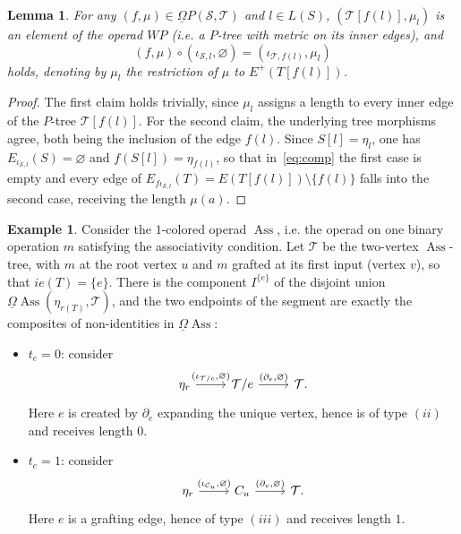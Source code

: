 \documentclass{amsart}
\newtheorem{lemma}[formula]{Lemma}
\theoremstyle{definition}
\newtheorem{example}[formula]{Example}
\theoremstyle{remark}
\newcommand{\lb}{\lbrace}
\newcommand{\rb}{\rbrace}
\DeclareMathOperator{\Ass}{Ass}
\begin{document}
	\begin{lemma}\label{lm:leafcomp}
		For any $(f,\mu)\in\underline{\Omega} P(\mathcal{S},\mathcal{T})$ and $l\in L(S)$, $(\mathcal{T}[f(l)],\mu_{l})$ is an element of the operad $WP$ (i.e. a  $P$-tree with metric on its inner edges), and
		\[
			(f,\mu)\circ(\iota_{\mathcal{S},l},\varnothing)=(\iota_{\mathcal{T},f(l)},\mu_{l})
		\]
		holds, denoting by
		$\mu_{l}$ the restriction of $\mu$ to $E^{+}(T[f(l)])$. 
	\end{lemma}
	\begin{proof}
		The first claim holds trivially, since $\mu_{l}$ assigns a length to every inner edge of the $P$-tree $\mathcal{T}[f(l)]$. 
		For the second claim, the underlying tree morphisms agree, both being the inclusion of the edge $f(l)$.
		Since $S[l]=\eta_l$, one has $E_{\iota_{\mathcal{S},l}}(S)=\varnothing$ and $f(S[l])=\eta_{f(l)}$, so that in~\eqref{eq:comp} the first case is empty and every edge of
		$E_{f\iota_{\mathcal{S},l}}(T)=E(T[f(l)])\setminus\{f(l)\}$ falls into the second case, receiving the length $\mu(a)$.
	\end{proof}

	\begin{example}\label{ex:two-vertex}
		Consider the $1$-colored operad $\Ass$, i.e. the operad on one binary operation $m$ satisfying the associativity condition. 
		Let $\mathcal T$ be the two-vertex $\Ass$-tree, with $m$ at the root vertex $u$ and $m$
		grafted at its first input (vertex $v$), so that $ie(T)=\lb e\rb$.
		There is the component $I^{\lb e\rb}$ of the disjoint union $\underline{\Omega} \Ass(\eta_{r(T)},\mathcal{T})$, and the two endpoints of the segment are
		exactly the composites of non-identities in $\underline\Omega \Ass$:
		\begin{itemize}
			\item $t_e=0$: consider
			\[
			\begin{tikzcd}
			\eta_{r} \arrow{r}{(\iota_{\mathcal{T}/e},\varnothing)} &
			\mathcal{T}/e
			\arrow{r}{(\partial_e,\varnothing)} &\mathcal{T}.
			\end{tikzcd}
			\] 
			Here $e$ is created by
			$\partial_e$ expanding the unique vertex, hence is of type $(ii)$ and receives
			length $0$.
			\item $t_e=1$: consider
			\[
			\begin{tikzcd} \eta_{r}\arrow{r}{(\iota_{\mathcal{C}_{u}},\varnothing)} & 
			C_{u} \arrow{r}{(\partial_{v},\varnothing)} &
			\mathcal{T}.
			\end{tikzcd}
			\] 
			Here $e$ is a grafting edge, hence of type $(iii)$ and receives length $1$.
		\end{itemize}
	\end{example}
			
\end{document}

